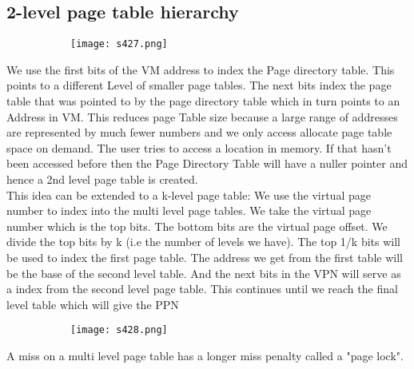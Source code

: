\documentclass[8pt]{extreport}
\begin{document}
\subsection{2-level page table hierarchy}
\begin{figure}[H]
\begin{subfigure}[b]{0.4\linewidth}
\texttt{[image: s427.png]}
\end{subfigure}
\end{figure}
We use the first bits of the VM address to index the Page directory table. This points to a different Level of smaller page tables. The next bits index the page table that was pointed to by the page directory table which in turn points to an Address in VM. This reduces page Table size because a large range of addresses are represented by much fewer numbers and we only access allocate page table space on demand. The user tries to access a location in memory. If that hasn't been accessed before then the Page Directory Table will have a nuller pointer and hence a 2nd level page table is created.\\
This idea can be extended to a k-level page table:
We use the virtual page number to index into the multi level page tables. We take the virtual page number which is the top bits. The bottom bits are the virtual page offset. We divide the top bits by k (i.e the number of levels we have). The top 1/k bits will be used to index the first page table. The address we get from the first table will be the base of the second level table. And the next bits in the VPN will serve as a index from the second level page table. This continues until we reach the final level table which will give the PPN
\begin{figure}[H]
\begin{subfigure}[b]{0.4\linewidth}
\texttt{[image: s428.png]}
\end{subfigure}
\end{figure}
A miss on a multi level page table has a longer miss penalty called a "page lock".
\end{document}
